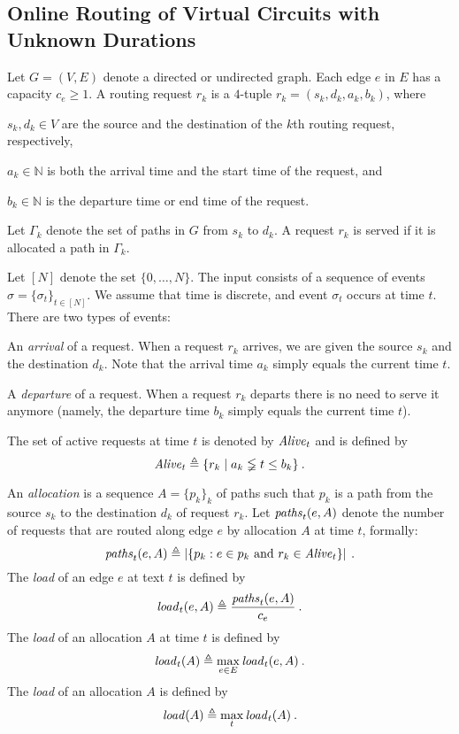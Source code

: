 \documentclass[11pt]{article}
\newenvironment{proof sketch}[1]{\noindent {\emph{Proof sketch of #1:}}}{\hfill \qed}
\newcommand{\eqdf}{\triangleq}
\newcommand{\NNN}{[N]}
\newcommand{\TS}{a_k}
\newcommand{\TE}{b_k}
\newcommand{\event}{\text{$\sigma$}}
\newcommand{\load}{\text{\textit{load}}}
\newcommand{\alive}{\text{\textit{Alive}}}
\newcommand{\paths}{\text{\textit{paths}}_t}
\newcommand{\NN}{{\mathbb{N}}}
\begin{document}
\subsection{Online Routing of Virtual Circuits with Unknown Durations}
Let $G=(V,E)$ denote a directed or undirected graph.
Each edge $e$ in $E$ has a capacity $c_e\geq 1$.  A routing request $r_k$ is a $4$-tuple $r_k=
(s_k,d_k,\TS,\TE)$, where
\begin{inparaenum}[(i)]
\item
  $s_k,d_k \in V$ are the source and the destination of the $k$th
  routing request, respectively,
\item $\TS\in \NN$ is both the arrival time and the start time of the request, and
\item $\TE \in \NN$ is the departure time or end time of the request.
\end{inparaenum}
Let $\Gamma_k$ denote the set of paths in $G$ from $s_k$ to $d_k$.
A request $r_k$ is served if it is allocated  a path in $\Gamma_k$.

Let $\NNN$ denote the set $\{0,\ldots,N\}$.
The input consists of a sequence of events
$\sigma=\{\event_t\}_{t \in \NNN}$.  We assume that time is discrete, and
event $\event_t$ occurs at time $t$.
There are two types of events:
\begin{inparaenum}[(i)]
\item An \emph{arrival} of a request. When a request $r_k$ arrives, we
  are given the source $s_k$ and the destination $d_k$. Note that the
  arrival time $\TS$ simply equals the current time $t$.
\item A \emph{departure} of a request. When a request $r_k$ departs
  there is no need to serve it anymore (namely, the departure time $\TE$ simply equals the  current time $t$).
\end{inparaenum}

The set of active requests at time $t$ is denoted by $\alive_t$ and is defined by
\[
    \alive_t \eqdf \{ r_k \mid \TS\lneqq t \leq \TE\}\:.
\]


An \emph{allocation} is a sequence $A=\{p_k\}_k$ of paths such that
$p_k$ is a path from the source $s_k$ to the destination $d_k$ of request $r_k$.
Let $\paths(e,A)$ denote the number of requests that are routed along edge $e$ by allocation $A$ at time $t$, formally:
\[
\paths(e,A) \eqdf \left|\{p_k : e\in p_k \text{ and } r_k \in \alive_t\}\right|\:.
\]
The \emph{load} of an edge $e$ at text $t$ is defined by
\[
\load_t(e,A) \eqdf \frac{\paths(e,A)}{c_e}\:.
\]
The \emph{load} of an allocation $A$ at time $t$ is defined by
\[
\load_t(A) \eqdf \max_{e\in E} \load_t(e,A) \:.
\]
The \emph{load} of an allocation $A$ is defined by
\[
\load(A) \eqdf \max_t \load_t (A)\:.
\]
\end{document}
